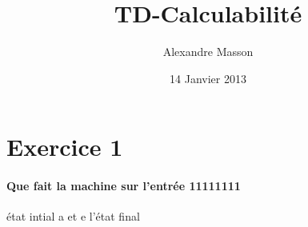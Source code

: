 \documentclass{article}
\title{TD-Calculabilité}
\author{Alexandre Masson}
\date{14 Janvier 2013}
\begin{document}
\section{Exercice 1}
\paragraph{Que fait la machine sur l'entrée 11111111}état intial a  et e l'état final
\end{document}
